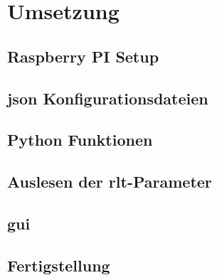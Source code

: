 \chapter{Umsetzung}

\section{Raspberry PI Setup}
\setAuthor{\pezze}


\setAuthor{\mangeng}


\section{\acs{json} Konfigurationsdateien}
\setAuthor{\pezze}



\setAuthor{\schneider}


\section{Python Funktionen}
\setAuthor{\pezze}


\section{Auslesen der \acs{rlt}-Parameter}
\setAuthor{\schneider}


\section{\acf{gui}}
\setAuthor{\pezze}



\section{Fertigstellung}
\setAuthor{\schneider}


\setAuthor{\pezze}


